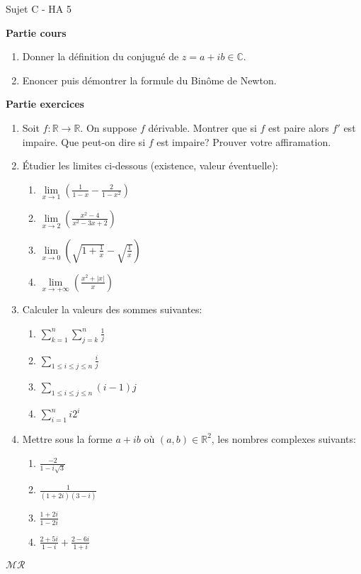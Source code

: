 \documentclass[a4paper,11pt, landscape]{article}
\begin{document}
\begin{multicols*}{3}
\centerline{Sujet C - HA 5}
\begin{flushleft}
  \textbf{Partie cours} 
\end{flushleft} 
\begin{enumerate}[leftmargin=*]
  \item Donner la définition du conjugué de $z = a + ib \in \mathbb{C}$.
  \item Enoncer puis démontrer la formule du Binôme de Newton.
\end{enumerate}
\textbf{Partie exercices}
\begin{enumerate}[leftmargin=*]
  \item Soit $f : \mathbb{R} \rightarrow \mathbb{R}$. On suppose $f$ dérivable. Montrer que si $f$ est paire alors $f'$ est impaire. Que peut-on dire si $f$ est impaire? Prouver votre affiramation.
  \item Étudier les limites ci-dessous (existence, valeur éventuelle):
  \begin{enumerate}
    \item $\lim\limits_{x \rightarrow 1}\left(\frac{1}{1-x} - \frac{2}{1-x^2}\right)$
    \item $\lim\limits_{x \rightarrow 2}\left(\frac{x^2 - 4}{x^2 - 3x+2}\right)$
    \item $\lim\limits_{x \rightarrow 0 }\left(\sqrt{1+\frac{1}{x}} - \sqrt{\frac{1}{x}}\right)$
    \item $\lim\limits_{x \rightarrow +\infty }\left(\frac{x^2 + |x|}{x}\right)$
  \end{enumerate}
  \item Calculer la valeurs des sommes suivantes:
  \begin{enumerate}
    \item $\sum\limits_{k=1}^n\sum\limits_{j=k}^n\frac{1}{j}$
    \item $\sum\limits_{1\leq i \leq j \leq n}\frac{i}{j}$
    \item $\sum\limits_{1\leq i \leq j \leq n}(i-1)j$
    \item $\sum\limits_{i=1}^ni2^i$
  \end{enumerate}
\item Mettre sous la forme $a + ib$ où $(a,b) \in \mathbb{R}^2$, les nombres complexes suivants:
\begin{enumerate}
  \item $\frac{-2}{1-i\sqrt{3}}$
  \item $\frac{1}{(1+2i)(3-i)}$
  \item $\frac{1+2i}{1-2i}$
  \item $\frac{2+5i}{1-i} + \frac{2-6i}{1+i}$
\end{enumerate}
\end{enumerate}
\centerline{$\mathcal{MR}$}


\end{multicols*}
\end{document}
